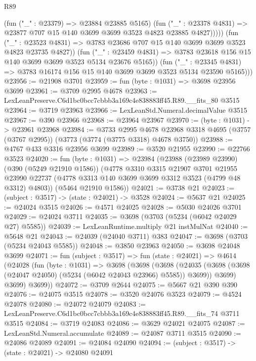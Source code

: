 \begin{lexlean}{R89}
\begin{coremodule}
                    (fun ("_" : @23379) => @23884 @23885 @5165)
                    (fun ("_" : @23378 @4831) =>
                    @23877 @707 @15 @140 @3699 @3699 @3523 @4823 @23885 @4827)))))
            (fun ("_" : @23523 @4831) =>
            @3783 @23686 @707 @15 @140 @3699 @3699 @3523 @4823 @23735 @4827))
          (fun ("_" : @23459 @4831) =>
          @3783 @23618 @156 @15 @140 @3699 @3699 @3523 @5134 @23676 @5165))
        (fun ("_" : @23345 @4831) =>
        @3783 @16174 @156 @15 @140 @3699 @3699 @3523 @5134 @23590 @5165)))
@23956 := @21908 @3701
@23959 := fun (byte : @1031) => @3698 @23956 @3699
@23961 := @3709 @2995 @4678
@23963 := LexLeanPreserve.C6d1bc0bcc7cbbb3a169c4e838883ff45.R89.__fits_80 @3515
@23964 := @3719 @23963
@23966 := LexLeanStd.Numeral.decimalValue @3515
@23967 := @390 @23966
@23968 := @23964 @23967
@23970 := (byte : @1031) -> @23961 @23968
@23984 := @3733
    @2995
    @4678
    @23968
    @3318
    @4695
    (@3757 (@3767 @2995))
    (@3773 (@3774 (@3775 @3318) @4678 @3750))
@23988 := @4767 @433 @3316 @23956 @3699
@23989 := @3520 @21955
@23990 := @22766 @3523
@24020 := fun (byte : @1031) =>
  @23984
    (@23988
      (@23989 @23990)
      (@390 (@5249 @21910 @1586))
      (@4778
        @3310
        @3315
        @21907
        @3701
        @21955
        @23990
        @22737
        (@4778 @3313 @140 @3699 @3699 @3312 @3523 (@4799 @48 @3312) @4803))
      (@5464 @21910 @1586))
@24021 := @3738 @21
@24023 := (subject : @3517) -> (state : @24021) -> @3528
@24024 := @5637 @21
@24025 := @24024 @3515
@24026 := @4571 @24025
@24028 := @5030 @24026 @3701
@24029 := @24024 @3711
@24035 := @3698 (@3703 (@5234 (@6042 @24029 @27) @5585))
@24039 := LexLeanRuntime.multiply @21 instMulNat
@24040 := @5648 @21
@24043 := @24039 (@24040 @3711) @383
@24047 := @3698 (@3703 (@5234 @24043 @5585))
@24048 := @3850 @23963
@24050 := @3698 @24048 @3699
@24071 := fun (subject : @3517) =>
  fun (state : @24021) =>
  @4614
    (@24028
      (fun (byte : @1031) =>
      @3698
        (@3698
          (@3698
            (@24035 (@3698 (@3698 (@24047 @24050) (@5234 (@6042 @24043 @23966) @5585)) @3699))
            @3699)
          @3699)
        @3699))
@24072 := @3709 @2644
@24075 := @5667 @21 @390 @390
@24076 := @24075 @3515
@24078 := @3520 @24076 @3523
@24079 := @4524 @24078
@24080 := @24072 @24079
@24083 := LexLeanPreserve.C6d1bc0bcc7cbbb3a169c4e838883ff45.R89.__fits_74 @3711 @3515
@24084 := @3719 @24083
@24086 := @3629 @24021 @24075
@24087 := LexLeanStd.Numeral.accumulate
@24089 := @24087 @3711 @3515
@24090 := @24086 @24089
@24091 := @24084 @24090
@24094 := (subject : @3517) -> (state : @24021) -> @24080 @24091

\end{coremodule}
\end{lexlean}
